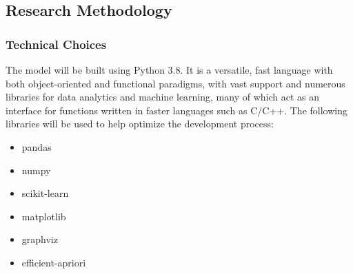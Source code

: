 \documentclass[a4paper,11pt]{article}
\begin{document}
\subsection{Research Methodology}
\subsubsection{Technical Choices}
The model will be built using Python 3.8. It is a versatile, fast language with both object-oriented and functional paradigms, with vast support and numerous libraries for data analytics and machine learning, many of which act as an interface for functions written in faster languages such as C/C++. The following libraries will be used to help optimize the development process:
\begin{itemize}
\item pandas
\item numpy
\item scikit-learn
\item matplotlib
\item graphviz
\item efficient-apriori
\end{itemize}
\end{document}
